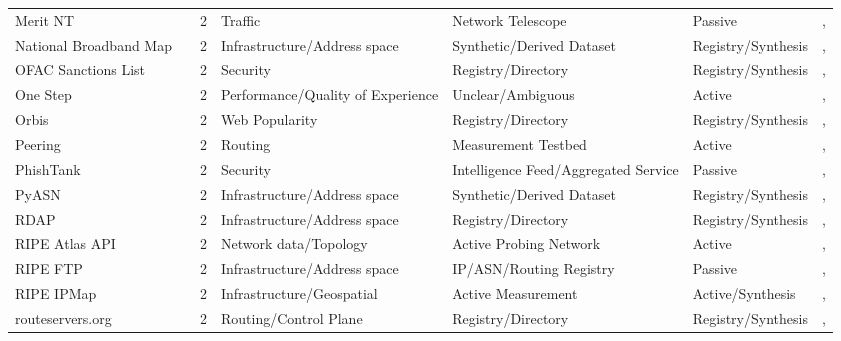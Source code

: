 \begin{table}[h!]
\begin{tabular}{lllllll}
Merit NT & \cite{11267522} & 2 & Traffic & Network Telescope & Passive & \cite{10.1145/3777912.3839790}, \cite{10.1007/978-3-032-18268-5_14} \\
National Broadband Map & \cite{national_broadband_map} & 2 & Infrastructure/Address space & Synthetic/Derived Dataset & Registry/Synthesis & \cite{10.1145/3646547.3688441}, \cite{10.1007/978-3-031-85960-1_20} \\
OFAC Sanctions List & \cite{ofac} & 2 & Security & Registry/Directory & Registry/Synthesis & \cite{10.1145/3618257.3624824}, \cite{10.1145/3517745.3561423} \\
One Step & \cite{one_step_measurement} & 2 & Performance/Quality of Experience & Unclear/Ambiguous & Active & \cite{10.1145/3618257.3624838}, \cite{10.1007/978-3-030-98785-5_10} \\
Orbis & \cite{orbis_database} & 2 & Web Popularity & Registry/Directory & Registry/Synthesis & \cite{10.1145/3487552.3487822}, \cite{10.1007/978-3-030-98785-5_30} \\
Peering & \cite{10.1145/3359989.3365414} & 2 & Routing & Measurement Testbed & Active & \cite{10.1145/3517745.3561421}, \cite{10.1007/978-3-032-18268-5_3} \\
PhishTank & \cite{phishtank} & 2 & Security & Intelligence Feed/Aggregated Service & Passive & \cite{10.1145/3487552.3487857}, \cite{10.1007/978-3-031-28486-1_24} \\
PyASN & \cite{pyasn} & 2 & Infrastructure/Address space & Synthetic/Derived Dataset & Registry/Synthesis & \cite{10.1145/3487552.3487854}, \cite{10.1007/978-3-031-85960-1_9} \\
RDAP & \cite{rdap_ietf} & 2 & Infrastructure/Address space & Registry/Directory & Registry/Synthesis & \cite{10.1007/978-3-031-56249-5_9}, \cite{10.1007/978-3-031-56249-5_10} \\
RIPE Atlas API & \cite{atlasapi} & 2 & Network data/Topology & Active Probing Network & Active & \cite{10.1145/3777912.3839804}, \cite{10.1145/3777912.3809149} \\
RIPE FTP & \cite{ripeftp} & 2 & Infrastructure/Address space & IP/ASN/Routing Registry & Passive & \cite{10.1145/3730567.3764452}, \cite{10.1145/3618257.3624815} \\
RIPE IPMap & \cite{ipmap} & 2 & Infrastructure/Geospatial & Active Measurement & Active/Synthesis & \cite{10.1145/3730567.3764427}, \cite{10.1145/3777912.3839804} \\
routeservers.org & \cite{routeservers} & 2 & Routing/Control Plane & Registry/Directory & Registry/Synthesis & \cite{10.1145/3618257.3624812}, \cite{10.1007/978-3-031-85960-1_15} \\

\end{tabular}
\end{table}
